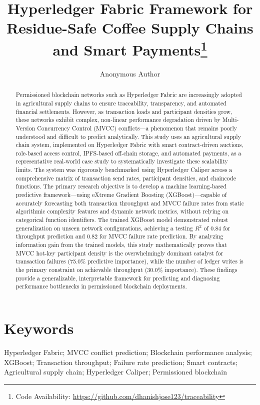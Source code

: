 \documentclass[manuscript,screen]{acmart}
\title{Hyperledger Fabric Framework for Residue-Safe Coffee Supply Chains and Smart Payments\thanks{Code Availability: \url{https://github.com/dhanishjose123/traceability}}}
\author{Anonymous Author}
\affiliation{%
	\institution{Anonymous Institution}
	\city{Anonymous City}
	\state{Anonymous State}
	\country{Anonymous Country}
}
\begin{document}
	
	\maketitle
		\begin{abstract}
		Permissioned blockchain networks such as Hyperledger Fabric are increasingly adopted in agricultural supply chains to ensure traceability, transparency, and automated financial settlements. However, as transaction loads and participant densities grow, these networks exhibit complex, non-linear performance degradation driven by Multi-Version Concurrency Control (MVCC) conflicts—a phenomenon that remains poorly understood and difficult to predict analytically. This study uses an agricultural supply chain system, implemented on Hyperledger Fabric with smart contract-driven auctions, role-based access control, IPFS-based off-chain storage, and automated payments, as a representative real-world case study to systematically investigate these scalability limits. The system was rigorously benchmarked using Hyperledger Caliper across a comprehensive matrix of transaction send rates, participant densities, and chaincode functions. The primary research objective is to develop a machine learning-based predictive framework—using eXtreme Gradient Boosting (XGBoost)—capable of accurately forecasting both transaction throughput and MVCC failure rates from static algorithmic complexity features and dynamic network metrics, without relying on categorical function identifiers. The trained XGBoost model demonstrated robust generalization on unseen network configurations, achieving a testing $R^2$ of 0.84 for throughput prediction and 0.82 for MVCC failure rate prediction. By analyzing information gain from the trained models, this study mathematically proves that MVCC hot-key participant density is the overwhelmingly dominant catalyst for transaction failures (75.0\% predictive importance), while the number of ledger writes is the primary constraint on achievable throughput (30.0\% importance). These findings provide a generalizable, interpretable framework for predicting and diagnosing performance bottlenecks in permissioned blockchain deployments.
	\end{abstract}
	
	
	
	
	
	\section*{Keywords}
	Hyperledger Fabric; MVCC conflict prediction; Blockchain performance analysis; 
	XGBoost; Transaction throughput; Failure rate prediction; Smart contracts; 
	Agricultural supply chain; Hyperledger Caliper; Permissioned blockchain
	
\end{document}
